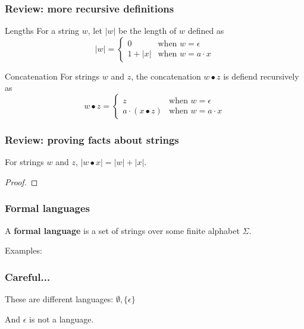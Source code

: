\begin{frame}
  \frametitle{Review: more recursive definitions}

  \begin{block}{Lengths}
    For a string $w$, let $|w|$ be the length of $w$ defined as
    \[
    |w| = \left\{
    \begin{array}{ll}
      0 & \mbox{when $w=\epsilon$} \\
      1 + |x| & \mbox{when $w=a\cdot x$}
    \end{array}
    \right.
    \]
  \end{block}

  \begin{block}{Concatenation}
    For strings $w$ and $z$, the concatenation $w\bullet z$ is defiend
    recursively as
    \[
    w\bullet z = \left\{
    \begin{array}{ll}
      z                   & \mbox{when $w=\epsilon$} \\
      a\cdot(x\bullet z)  & \mbox{when $w=a\cdot x$}
    \end{array}
    \right.
    \]
  \end{block} 
\end{frame}

\begin{frame}
  \frametitle{Review: proving facts about strings}

  \begin{lemma}
    For strings $w$ and $z$, $|w\bullet x|=|w|+|x|$.
  \end{lemma}

  \begin{proof}
    \vspace{2in}
  \end{proof}
\end{frame}

\begin{frame}
  \frametitle{Formal languages}

  A {\color{red}\bf formal language} is a set of strings over some
  finite alphabet $\Sigma$.

  Examples:
  \vspace{2.5in}
\end{frame}

\begin{frame}
  \frametitle{Careful...}

  These are different languages: $\emptyset,\{\epsilon\}$

  And $\epsilon$ is not a language.

\end{frame}

